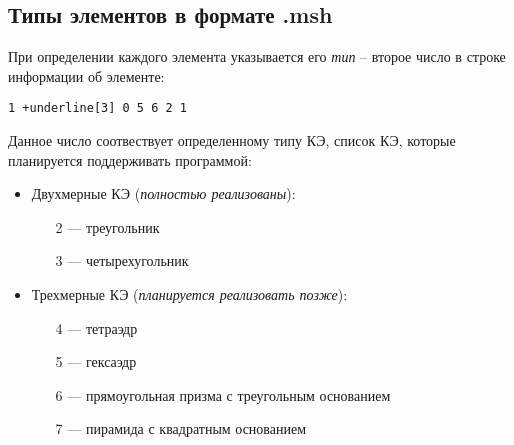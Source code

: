 \subsection{Типы элементов в формате .msh}\label{elem_types}
При определении каждого элемента указывается его \textit{тип} -- второе число в строке информации об элементе:
\begin{Verbatim}[commandchars=+\[\]]
	1 +underline[3] 0 5 6 2 1
\end{Verbatim}
Данное число соотвествует определенному типу КЭ, список КЭ, которые планируется поддерживать программой:
\begin{itemize}
	\item Двухмерные КЭ (\textit{полностью реализованы}):
	\begin{enumerate}
		\item[2 ---] треугольник
		\item[3 ---] четырехугольник
	\end{enumerate}
	
	\item Трехмерные КЭ (\textit{планируется реализовать позже}):
	\begin{enumerate}
		\item[4 ---] тетраэдр
		\item[5 ---] гексаэдр
		\item[6 ---] прямоугольная призма с треугольным основанием
		\item[7 ---] пирамида с квадратным основанием
	\end{enumerate}
\end{itemize}